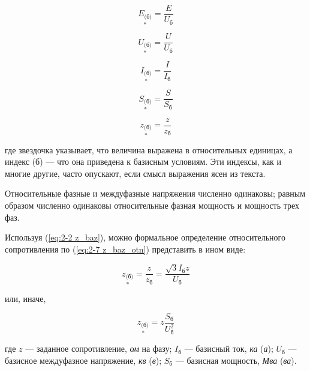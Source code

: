 \begin{equation} %
	\label{eq:2-3 E_baz_otn}
	\underset{*}{E_{\text{(б)}}} = \frac{E}{U_{\text{б}}}
\end{equation}

\begin{equation} %
	\label{eq:2-4 U_baz_otn}
	\underset{*}{U_{\text{(б)}}} = \frac{U}{U_{\text{б}}}
\end{equation}

\begin{equation} %
	\label{eq:2-5 I_baz_otn}
	\underset{*}{I_{\text{(б)}}} = \frac{I}{I_{\text{б}}}
\end{equation}

\begin{equation} %
	\label{eq:2-6 S_baz_otn}
	\underset{*}{S_{\text{(б)}}} = \frac{S}{S_{\text{б}}}
\end{equation}

\begin{equation} %
	\label{eq:2-7 z_baz_otn}
	\underset{*}{z_{\text{(б)}}} = \frac{z}{z_{\text{б}}}
\end{equation}

где звездочка указывает, что величина выражена в относительных единицах, а индекс (б) --- что она приведена к базисным условиям. Эти индексы, как и многие другие, часто опускают, если смысл выражения ясен из текста.

Относительные фазные и междуфазные напряжения численно одинаковы; равным образом численно одинаковы относительные фазная мощность и мощность трех фаз.

Используя (\ref{eq:2-2 z_baz}), можно формальное определение относительного сопротивления по (\ref{eq:2-7 z_baz_otn}) представить в ином виде:

\begin{equation} %
	\label{eq:2-8 z_baz_otn 2}
	\underset{*}{z_{\text{(б)}}} = \frac{z}{z_{\text{б}}} = \frac{\sqrt{3}I_{\text{б}}z}{U_{\text{б}}}
\end{equation}

или, иначе,

\begin{equation} %
	\label{eq:2-9 z_baz_otn 3}
	\underset{*}{z_{\text{(б)}}} = z\frac{S_{\text{б}}}{U_{\text{б}}^{2}}
\end{equation}

где $ z $ --- заданное сопротивление, \textit{ом} на фазу;
$ I_{\text{б}} $ --- базисный ток, \textit{ка} (\textit{а});
$ U_{\text{б}} $ --- базисное междуфазное напряжение, \textit{кв} (\textit{в});
$ S_{\text{б}} $ --- базисная мощность, \textit{Мва} (\textit{ва}).

